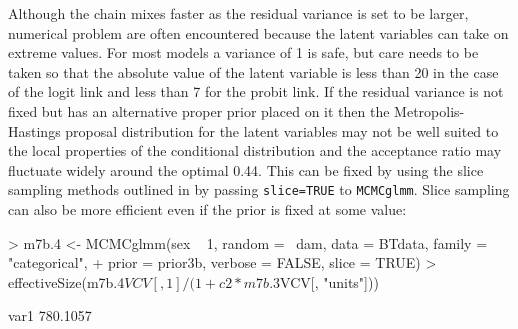 \documentclass{article}
\begin{document}
Although the chain mixes faster as the residual variance is set to be larger, numerical problem are often encountered because the latent variables can take on extreme values. For most models a variance of 1 is safe, but care needs to be taken so that the absolute value of the latent variable is less than 20 in the case of the logit link and less than 7 for the probit link. If the residual variance is not fixed but has an alternative proper prior placed on it then the Metropolis-Hastings proposal distribution for the latent variables may not be well suited to the local properties of the conditional distribution and the acceptance ratio may fluctuate widely around the optimal 0.44. This can be fixed by using the slice sampling methods outlined in \citet{Damien.1999} by passing \texttt{slice=TRUE} to \texttt{MCMCglmm}. Slice sampling can also be more efficient even if the prior is fixed at some value: 
 
\begin{Schunk}
\begin{Sinput}
> m7b.4 <- MCMCglmm(sex ~ 1, random = ~dam, data = BTdata, family = "categorical", 
+     prior = prior3b, verbose = FALSE, slice = TRUE)
> effectiveSize(m7b.4$VCV[, 1]/(1 + c2 * m7b.3$VCV[, "units"]))
\end{Sinput}
\begin{Soutput}
    var1 
780.1057 
\end{Soutput}
\end{Schunk}

\ifalone
\end{document}
